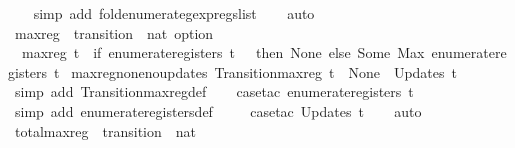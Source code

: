 \begin{isabellebody}
\ \ \isamarkupfalse%
\ {\isacharparenleft}simp\ add{\isacharcolon}\ fold{\isacharunderscore}enumerate{\isacharunderscore}gexp{\isacharunderscore}regs{\isacharunderscore}list{\isacharparenright}\isanewline
\ \ \isamarkupfalse%
\ auto%
\endisatagproof
{\isafoldproof}%
%
\isadelimproof
\isanewline
%
\endisadelimproof
\isanewline
{}\isamarkupfalse%
\ max{\isacharunderscore}reg\ {\isacharcolon}{\isacharcolon}\ {\isachardoublequoteopen}transition\ {\isasymRightarrow}\ nat\ option{\isachardoublequoteclose}\ \isanewline
\ \ {\isachardoublequoteopen}max{\isacharunderscore}reg\ t\ {\isacharequal}\ {\isacharparenleft}if\ enumerate{\isacharunderscore}registers\ t\ {\isacharequal}\ {\isacharbraceleft}{\isacharbraceright}\ then\ None\ else\ Some\ {\isacharparenleft}Max\ {\isacharparenleft}enumerate{\isacharunderscore}registers\ t{\isacharparenright}{\isacharparenright}{\isacharparenright}{\isachardoublequoteclose}\isanewline
\isanewline
{}\isamarkupfalse%
\ max{\isacharunderscore}reg{\isacharunderscore}none{\isacharunderscore}no{\isacharunderscore}updates{\isacharcolon}\ {\isachardoublequoteopen}Transition{\isachardot}max{\isacharunderscore}reg\ t\ {\isacharequal}\ None\ {\isasymLongrightarrow}\ Updates\ t\ {\isacharequal}\ {\isacharbrackleft}{\isacharbrackright}{\isachardoublequoteclose}\isanewline
%
\isadelimproof
\ \ %
\endisadelimproof
%
\isatagproof
{}\isamarkupfalse%
\ {\isacharparenleft}simp\ add{\isacharcolon}\ Transition{\isachardot}max{\isacharunderscore}reg{\isacharunderscore}def{\isacharparenright}\isanewline
\ \ \isamarkupfalse%
\ {\isacharparenleft}case{\isacharunderscore}tac\ {\isachardoublequoteopen}enumerate{\isacharunderscore}registers\ t\ {\isacharequal}\ {\isacharbraceleft}{\isacharbraceright}{\isachardoublequoteclose}{\isacharparenright}\isanewline
\ \ \ \isamarkupfalse%
\ {\isacharparenleft}simp\ add{\isacharcolon}\ enumerate{\isacharunderscore}registers{\isacharunderscore}def{\isacharparenright}\isanewline
\ \ \ \isamarkupfalse%
\ {\isacharparenleft}case{\isacharunderscore}tac\ {\isachardoublequoteopen}Updates\ t{\isachardoublequoteclose}{\isacharparenright}\isanewline
\ \ \isamarkupfalse%
\ auto%
\endisatagproof
{\isafoldproof}%
%
\isadelimproof
\isanewline
%
\endisadelimproof
\isanewline
{}\isamarkupfalse%
\ total{\isacharunderscore}max{\isacharunderscore}reg\ {\isacharcolon}{\isacharcolon}\ {\isachardoublequoteopen}transition\ {\isasymRightarrow}\ nat{\isachardoublequoteclose}\ \isanewline

\end{isabellebody}

